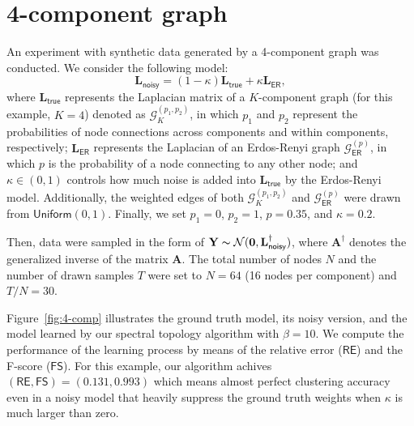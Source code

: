 \documentclass{article}
\begin{document}
\section{4-component graph}
An experiment with synthetic data generated by a 4-component graph was conducted.
We consider the following model:
\begin{equation}
  \mathbf{L}_{\mathsf{noisy}} = (1 - \kappa) \mathbf{L}_{\mathsf{true}} + \kappa \mathbf{L}_{\mathsf{ER}},
  \label{eq:model}
\end{equation}
where $\mathbf{L}_{\mathsf{true}}$ represents the Laplacian matrix of a $K$-component graph (for this example, $K = 4$)
denoted as $\mathcal{G}^{(p_1, p_2)}_K$,
in which $p_1$ and $p_2$ represent the probabilities of node connections across components and within components, respectively;
$\mathbf{L}_{\mathsf{ER}}$ represents the Laplacian of an Erdos-Renyi graph $\mathcal{G}^{(p)}_{\mathsf{ER}}$, in which $p$
is the probability of a node connecting to any other node; and $\kappa \in (0, 1)$ controls how much noise is added into
$\mathbf{L}_{\mathsf{true}}$ by the Erdos-Renyi model. Additionally, the weighted edges of both $\mathcal{G}^{(p_1, p_2)}_K$
and $\mathcal{G}^{(p)}_{\mathsf{ER}}$ were drawn from $\textsf{Uniform}(0, 1)$. Finally, we set $p_1 = 0$, $p_2 = 1$,
$p = 0.35$, and $\kappa = 0.2$.

Then, data were sampled in the form of $\mathbf{Y} \thicksim \mathcal{N}(\mathbf{0}, \mathbf{L}_{\mathsf{noisy}}^{\dagger})$,
where $\mathbf{A}^{\dagger}$ denotes the generalized inverse of the matrix $\mathbf{A}$. The total number of nodes $N$
and the number of drawn samples $T$ were set to $N = 64$ (16 nodes per component) and $T / N = 30$.

Figure~\ref{fig:4-comp} illustrates the ground truth model, its noisy version, and the model learned by our spectral
topology algorithm with $\beta = 10$. We compute the performance of the learning process by means of the relative error
($\textsf{RE}$) and the F-score ($\textsf{FS}$). For this example, our algorithm achives $(\mathsf{RE}, \mathsf{FS}) = (0.131, 0.993)$
which means almost perfect clustering accuracy even in a noisy model that heavily suppress the ground truth weights when $\kappa$ is much
larger than zero.
\end{document}
